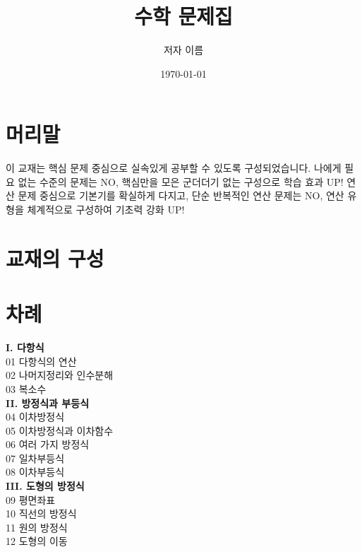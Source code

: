 \documentclass[a4paper,11pt]{book}
\begin{document}
	
	\title{\Huge{\textbf{수학 문제집}}}
	\author{저자 이름}
	\date{\today}
	\maketitle
	\tableofcontents
	\newpage
	
	\chapter*{머리말}
	이 교재는 핵심 문제 중심으로 실속있게 공부할 수 있도록 구성되었습니다. 
	나에게 필요 없는 수준의 문제는 NO, 핵심만을 모은 군더더기 없는 구성으로 학습 효과 UP!
	연산 문제 중심으로 기본기를 확실하게 다지고, 단순 반복적인 연산 문제는 NO, 
	연산 유형을 체계적으로 구성하여 기초력 강화 UP!
	
	\newpage
	
	\chapter*{교재의 구성}
	\begin{center}
	\end{center}
	
	\chapter*{차례}
	\begin{multicols}{2}
		\textbf{I. 다항식}\\
		01 다항식의 연산 \\
		02 나머지정리와 인수분해 \\
		03 복소수 \\
		
		\textbf{II. 방정식과 부등식}\\
		04 이차방정식 \\
		05 이차방정식과 이차함수 \\
		06 여러 가지 방정식 \\
		07 일차부등식 \\
		08 이차부등식 \\
		
		\textbf{III. 도형의 방정식}\\
		09 평면좌표 \\
		10 직선의 방정식 \\
		11 원의 방정식 \\
		12 도형의 이동 \\
	\end{multicols}
	
\end{document}
